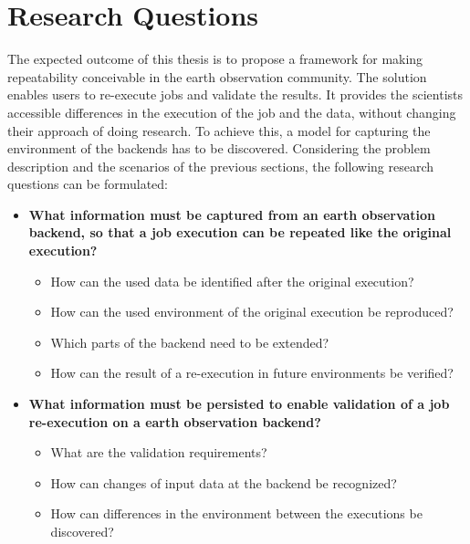 \documentclass[draft,final]{vutinfth} %
\begin{document}
\section{Research Questions}\label{research question}\label{Aim}
The expected outcome of this thesis is to propose a framework for making repeatability conceivable in the earth observation community. The solution enables users to re-execute jobs and validate the results. It provides the scientists accessible differences in the execution of the job and the data, without changing their approach of doing research. To achieve this, a model for capturing the environment of the backends has to be discovered. Considering the problem description and the scenarios of the previous sections, the following research questions can be formulated:

\begin{itemize}
	\item \textbf{What information must be captured from an earth observation backend, so that a job execution can be repeated like the original execution?}
	\begin{itemize}
		\item How can the used data be identified after the original execution?
		\item How can the used environment of the original execution be reproduced?
		\item Which parts of the backend need to be extended?
		\item How can the result of a re-execution in future environments be verified?
	\end{itemize}
	\item \textbf{What information must be persisted to enable validation of a job re-execution on a earth observation backend?}
	\begin{itemize}
		\item What are the validation requirements?
		\item How can changes of input data at the backend be recognized?
		\item How can differences in the environment between the executions be discovered?
	\end{itemize}
\end{itemize}
\end{document}
